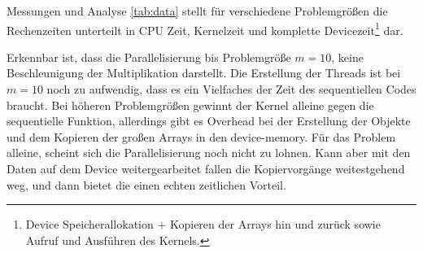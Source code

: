 \documentclass[
ngerman,
subtask=ruled %
]{tudaexercise}
\begin{document}
\begin{task}{Messungen und Analyse}
		\autoref{tab:data} stellt für verschiedene Problemgrößen die Rechenzeiten unterteilt in CPU Zeit, Kernelzeit und komplette Devicezeit\footnote{Device Speicherallokation + Kopieren der Arrays hin und zurück sowie Aufruf und Ausführen des Kernels.} dar.
	
		Erkennbar ist, dass die Parallelisierung bis Problemgröße $m=10$, keine Beschleunigung der Multiplikation darstellt.
		Die Erstellung der Threads ist bei $m=10$ noch zu aufwendig, dass es ein Vielfaches der Zeit des sequentiellen Codes braucht.
		Bei höheren Problemgrößen gewinnt der Kernel alleine gegen die sequentielle Funktion, allerdings gibt es Overhead bei der Erstellung der Objekte und dem Kopieren der großen Arrays in den device-memory.
		Für das Problem alleine, scheint sich die Parallelisierung noch nicht zu lohnen.
		Kann aber mit den Daten auf dem Device weitergearbeitet fallen die Kopiervorgänge weitestgehend weg, und dann bietet die einen echten zeitlichen Vorteil.
		
		
		
		
	\end{task}
\end{document}

